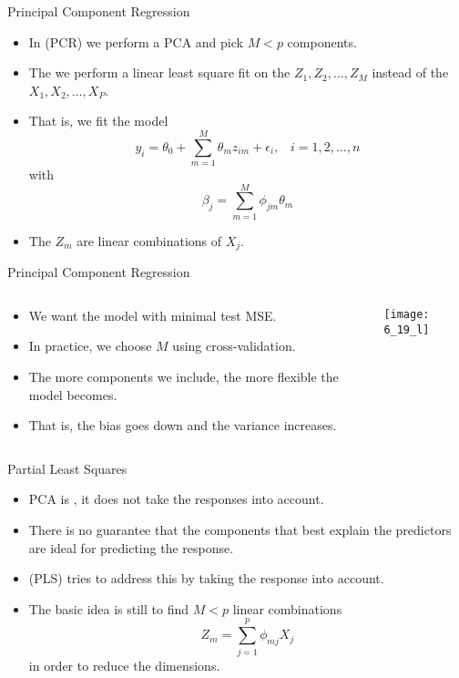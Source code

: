 \documentclass[mathserif, aspectratio=169]{beamer}
\begin{document}
\begin{frame}{Principal Component Regression}
	\begin{itemize}
		\item In  (PCR) we perform a
			PCA and pick $M < p$ components.
		\item The we perform a linear least square fit on the $Z_1, Z_2, \dots, Z_M$
			instead of the $X_1, X_2, \dots, X_P$.
		\item That is, we fit the model
			\[
				y_i = \theta_0 +
				\sum_{m=1}^M \theta_m z_{im} + \epsilon_i,
				\;\;\; i = 1, 2, \dots, n
			\]
			with
			\[
				\beta_j = \sum_{m=1}^M \phi_{jm} \theta_m
			\]
		\item The $Z_m$ are linear combinations of  $X_j$.
	\end{itemize}
\end{frame}

\begin{frame}{Principal Component Regression}
	\begin{columns}
		\begin{column}{0.6\textwidth}
			\begin{itemize}
				\item We want the model with minimal test MSE.
				\item In practice, we choose $M$ using
					cross-validation.
				\item The more components we include, the more
					flexible the model becomes.
				\item That is, the bias goes down and the
					variance increases.
			\end{itemize}
		\end{column}
		\begin{column}{0.4\textwidth}
			\begin{center}
				\texttt{[image: 6\_19\_l]}
			\end{center}
		\end{column}
	\end{columns}
\end{frame}

\begin{frame}{Partial Least Squares}
	\begin{itemize}
		\item PCA is , it does not take the responses into account.
		\item There is no guarantee that the components that best explain the predictors\\
			are ideal for predicting the response.
		\item {} (PLS) tries to address this by taking the response
			into account.
		\item The basic idea is still to find $M < p$ linear combinations
			\[
				Z_m = \sum_{j=1}^p \phi_{mj} X_j
			\]
			in order to reduce the dimensions.
	\end{itemize}
\end{frame}
\end{document}
